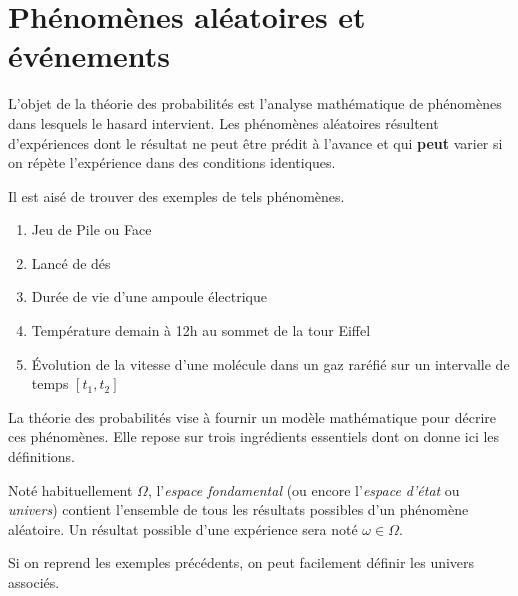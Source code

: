 \section{Phénomènes aléatoires et
événements}\label{I-phuxe9nomuxe8nes-aluxe9atoires-et-uxe9vuxe9nements}

L'objet de la théorie des probabilités est l'analyse mathématique de
phénomènes dans lesquels le hasard intervient. Les phénomènes aléatoires
résultent d'expériences dont le résultat ne peut être prédit à l'avance
et qui \textbf{peut} varier si on répète l'expérience dans des
conditions identiques.

Il est aisé de trouver des exemples de tels phénomènes.

\begin{exemple}\label{I-exemples}
\begin{enumerate}
\def\labelenumi{\arabic{enumi}.}
\tightlist
\item
  Jeu de Pile ou Face
\item
  Lancé de dés
\item
  Durée de vie d'une ampoule électrique
\item
  Température demain à 12h au sommet de la tour Eiffel
\item
  Évolution de la vitesse d'une molécule dans un gaz raréfié sur un
  intervalle de temps \([t_1,t_2]\)
\end{enumerate}

La théorie des probabilités vise à fournir un modèle mathématique pour
décrire ces phénomènes. Elle repose sur trois ingrédients essentiels
dont on donne ici les définitions.
\end{exemple}

\begin{definition}\label{I-lespace-fondamental}

Noté habituellement \(\Omega\), l'\emph{espace fondamental} (ou encore
l'\emph{espace d'état} ou \emph{univers}) contient l'ensemble de tous
les résultats possibles d'un phénomène aléatoire. Un résultat possible
d'une expérience sera noté \(\omega \in \Omega\).

Si on reprend les exemples précédents, on peut facilement définir les
univers associés.
\end{definition}

